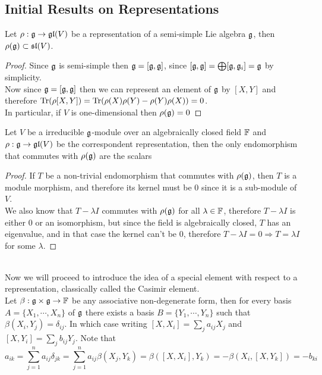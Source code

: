 \subsection*{Initial Results on Representations}
\begin{lema}
	Let $\rho:\mathfrak{g}\rightarrow \mathfrak{gl}(V)$ be a representation of a semi-simple Lie algebra $\mathfrak{g}$, then $\rho(\mathfrak{g})\subset \mathfrak{sl}(V)$.
	\label{trace0lemma}
\end{lema}
\begin{proof}
	Since $\mathfrak{g}$ is semi-simple then $\mathfrak{g}=[\mathfrak{g},\mathfrak{g}]$, since $[\mathfrak{g},\mathfrak{g}] = \bigoplus [\mathfrak{g},\mathfrak{g}_i] = \mathfrak{g}$ by simplicity.\\ 
	Now since $\mathfrak{g}=[\mathfrak{g},\mathfrak{g}]$ then we can represent an element of $\mathfrak{g}$ by $[X,Y]$ and therefore $\text{Tr}(\rho[X,Y]) = \text{Tr}(\rho(X)\rho(Y)-\rho(Y)\rho(X))=0$.\\
	In particular, if $V$ is one-dimensional then $\rho(\mathfrak{g}) = 0$
\end{proof}
\begin{lema}
	Let $V$ be a irreducible $\mathfrak{g}$-module over an algebraically closed field $\mathbb{F}$ and $\rho:\mathfrak{g} \rightarrow \mathfrak{gl}(V)$ be the correspondent representation, then the only endomorphism that commutes with $\rho(\mathfrak{g})$ are the scalars
	\label{Schur's Lemma}
\end{lema}
\begin{proof}
	If $T$ be a non-trivial endomorphism that commutes with $\rho(\mathfrak{g})$, then $T$ is a module morphism, and therefore its kernel must be $0$ since it is a sub-module of $V$.\\
	We also know that $T - \lambda I$ commutes with $\rho(\mathfrak{g})$ for all $\lambda \in \mathbb{F}$, therefore $T-\lambda I$ is either $0$ or an isomorphism, but since the field is algebraically closed, $T$ has an eigenvalue, and in that case the kernel can't be $0$, therefore $T-\lambda I = 0 \Rightarrow T=\lambda I$ for some $\lambda$.
\end{proof}\\
Now we will proceed to introduce the idea of a special element with respect to a representation, classically called the Casimir element.\\
Let $\beta:\mathfrak{g} \times \mathfrak{g} \rightarrow \mathbb{F}$ be any associative non-degenerate form, then for every basis $A=\{X_1,\cdots,X_n\}$ of $\mathfrak{g}$ there exists a basis $B=\{Y_1,\cdots,Y_n\}$ such that $\beta(X_i,Y_j)=\delta_{ij}$. In which case writing $[X,X_i] = \sum_j a_{ij} X_j$ and $[X,Y_i]=\sum_j b_{ij} Y_j$. Note that
$$a_{ik} = \sum_{j=1}^n a_{ij}\delta_{jk} = \sum_{j=1}^n a_{ij} \beta(X_j,Y_k) =\beta([X,X_i],Y_k) = -\beta (X_i,[X,Y_k]) = -b_{ki} $$

